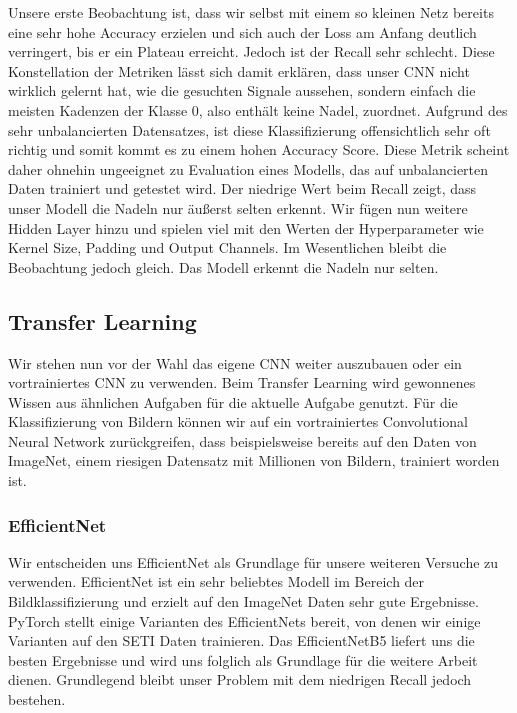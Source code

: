 \documentclass[12pt, a4paper]{article}
\begin{document}
Unsere erste Beobachtung ist, dass wir selbst mit einem so kleinen Netz bereits eine sehr hohe Accuracy erzielen und sich auch der Loss am Anfang deutlich verringert, bis er ein Plateau erreicht. Jedoch ist der Recall sehr schlecht. Diese Konstellation der Metriken lässt sich damit erklären, dass unser CNN nicht wirklich gelernt hat, wie die gesuchten Signale aussehen, sondern einfach die meisten Kadenzen der Klasse 0, also enthält keine Nadel, zuordnet. Aufgrund des sehr unbalancierten Datensatzes, ist diese Klassifizierung offensichtlich sehr oft richtig und somit kommt es zu einem hohen Accuracy Score. Diese Metrik scheint daher ohnehin ungeeignet zu Evaluation eines Modells, das auf unbalancierten Daten trainiert und getestet wird. Der niedrige Wert beim Recall zeigt, dass unser Modell die Nadeln nur äußerst selten erkennt. Wir fügen nun weitere Hidden Layer hinzu und spielen viel mit den Werten der Hyperparameter wie Kernel Size, Padding und Output Channels. Im Wesentlichen bleibt die Beobachtung jedoch gleich. Das Modell erkennt die Nadeln nur selten.

\subsection{Transfer Learning}
Wir stehen nun vor der Wahl das eigene CNN weiter auszubauen oder ein vortrainiertes CNN zu verwenden. Beim Transfer Learning wird gewonnenes Wissen aus ähnlichen Aufgaben für die aktuelle Aufgabe genutzt. Für die Klassifizierung von Bildern können wir auf ein vortrainiertes Convolutional Neural Network zurückgreifen, dass beispielsweise bereits auf den Daten von ImageNet, einem riesigen Datensatz mit Millionen von Bildern, trainiert worden ist.

\subsubsection{EfficientNet}
Wir entscheiden uns EfficientNet als Grundlage für unsere weiteren Versuche zu verwenden. EfficientNet ist ein sehr beliebtes Modell im Bereich der Bildklassifizierung und erzielt auf den ImageNet Daten sehr gute Ergebnisse. PyTorch stellt einige Varianten des EfficientNets bereit, von denen wir einige Varianten auf den SETI Daten trainieren. Das EfficientNetB5 liefert uns die besten Ergebnisse und wird uns folglich als Grundlage für die weitere Arbeit dienen. Grundlegend bleibt unser Problem mit dem niedrigen Recall jedoch bestehen.
\end{document}
